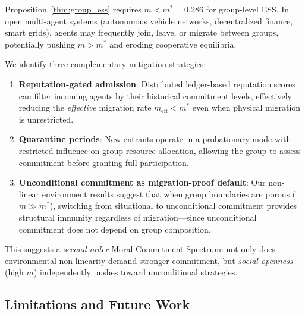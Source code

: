 \documentclass{article}
\begin{document}
Proposition~\ref{thm:group_ess} requires $m < m^* = 0.286$ for group-level ESS.
In open multi-agent systems (autonomous vehicle networks, decentralized finance, smart grids), agents may frequently join, leave, or migrate between groups, potentially pushing $m > m^*$ and eroding cooperative equilibria.

We identify three complementary mitigation strategies:
\begin{enumerate}
    \item \textbf{Reputation-gated admission}: Distributed ledger-based reputation scores~\citep{anastassacos2020cooperation} can filter incoming agents by their historical commitment levels, effectively reducing the \emph{effective} migration rate $m_{\text{eff}} < m^*$ even when physical migration is unrestricted.
    \item \textbf{Quarantine periods}: New entrants operate in a probationary mode with restricted influence on group resource allocation, allowing the group to assess commitment before granting full participation.
    \item \textbf{Unconditional commitment as migration-proof default}: Our non-linear environment results suggest that when group boundaries are porous ($m \gg m^*$), switching from situational to unconditional commitment provides structural immunity regardless of migration---since unconditional commitment does not depend on group composition.
\end{enumerate}

This suggests a \emph{second-order} Moral Commitment Spectrum: not only does environmental non-linearity demand stronger commitment, but \emph{social openness} (high $m$) independently pushes toward unconditional strategies.

\subsection{Limitations and Future Work}\label{sec:limitations}
\end{document}
